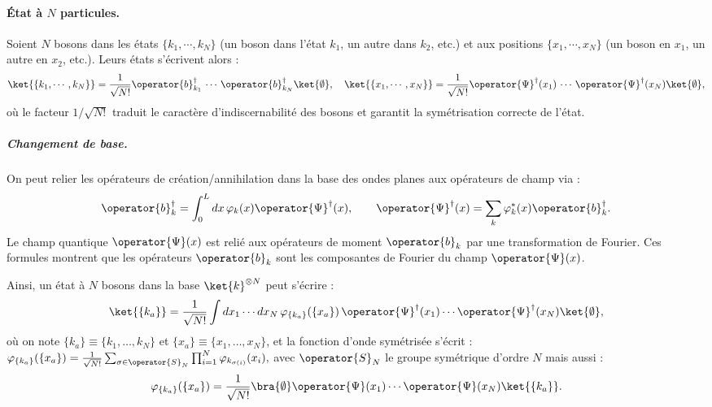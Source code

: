\paragraph{État à $N$ particules.} Soient $N$ bosons dans les états $\{ k_1 , \cdots , k_N \}$ (un boson dans l’état $k_1$, un autre dans $k_2$, etc.) et aux positions $\{ x_1 , \cdots , x_N \}$ (un boson en $x_1$, un autre en $x_2$, etc.). Leurs états s’écrivent alors :
\begin{eqnarray}
	\ket{ \{ k_1 , \cdots , k_N \}} = \frac{1}{\sqrt{N!}} \operator{b}_{k_1}^\dag\, \cdots \, \operator{b}_{k_N}^\dag \ket{\emptyset}, \quad \ket{\{x_1 , \cdots , x_N\}} = \frac{1}{\sqrt{N!}} \operator{\Psi}^\dag(x_1)\, \cdots \, \operator{\Psi}^\dag(x_N) \ket{\emptyset}	, \label{eq.chap.1.ket.N}
\end{eqnarray}
où le facteur \( 1/\sqrt{N!} \) traduit le caractère d’indiscernabilité des bosons et garantit la symétrisation correcte de l’état.

\begin{mdframed}[
	linewidth=0.5pt, 
	backgroundcolor=gray!5, 
	roundcorner=50pt,	
	innerleftmargin=5pt,
    innerrightmargin=5pt,
    innertopmargin=-10pt,
    innerbottommargin=2pt,
    leftmargin=2pt,
    rightmargin=2pt
	]
\subparagraph{Changement de base.}
On peut relier les opérateurs de création/annihilation dans la base des ondes planes aux opérateurs de champ via :
\begin{eqnarray}\label{chap.1:eq.rapel.etat.second.1}
	\operator{b}_k^\dagger = \int_0^L dx \, \varphi_k(x) \operator{\Psi}^\dagger(x), \qquad 
	\operator{\Psi}^\dagger(x) = \sum_k \varphi_k^\ast(x)\operator{b}_k^\dagger.\label{eq.chap.1.TF.1}
\end{eqnarray}
Le champ quantique $\operator{\Psi}(x)$ est relié aux opérateurs de moment $\operator{b}_k$ par une transformation de Fourier. Ces formules montrent que les opérateurs $\operator{b}_{k}$ sont les composantes de Fourier du champ $\operator{\Psi}(x)$.
\end{mdframed}
Ainsi, un état à \(N\) bosons dans la base \( \ket{k}^{\otimes N} \) peut s’écrire :
\begin{eqnarray}
	\ket{\{k_a\}} = \frac{1}{\sqrt{N!}} \int dx_1 \cdots dx_N \, \varphi_{\{k_a\}} ( \{x_a\} ) \, \operator{\Psi}^\dag(x_1) \cdots \operator{\Psi}^\dag(x_N) \ket{\emptyset},
\end{eqnarray}
où on note \( \{k_a\} \equiv \{k_1, \dots, k_N\} \) et \( \{x_a\} \equiv \{x_1, \dots, x_N\} \), et la fonction d’onde symétrisée s’écrit :
\(
	\varphi_{\{k_a\}} ( \{x_a\} ) = \frac{1}{\sqrt{N!}} \sum_{\sigma \in \operator{S}_N } \prod_{i=1}^N \varphi_{k_{\sigma(i)}}(x_i),
\) 
avec $\operator{S}_N $  le groupe symétrique d'ordre $N$ mais aussi :
\begin{eqnarray}\label{chap.1:eq.rapel.fonction.propre.N}
	\varphi_{\{k_a\}} (\{x_a\}) = \frac{1}{\sqrt{N!}} \bra{\emptyset} \operator{\Psi}(x_1) \cdots \operator{\Psi}(x_N) \ket{\{k_a\}}.
\end{eqnarray}



